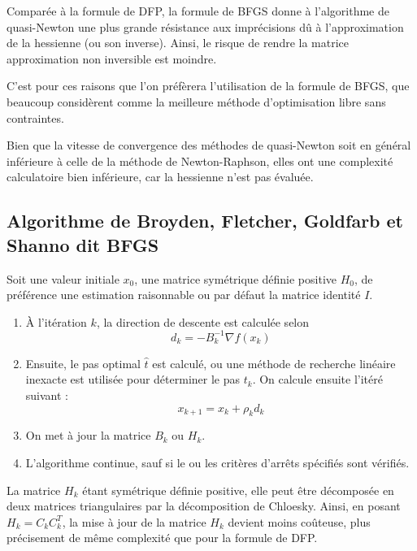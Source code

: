 \documentclass[3p, twocolumn]{elsarticle}
\begin{document}
Comparée à la formule de DFP, la formule de BFGS donne à l'algorithme de quasi-Newton une plus grande résistance aux imprécisions dû à l'approximation de la hessienne (ou son inverse). Ainsi, le risque de rendre la matrice approximation non inversible est moindre.

C'est pour ces raisons que l'on préfèrera l'utilisation de la formule de BFGS, que beaucoup considèrent comme la meilleure méthode d'optimisation libre sans contraintes.

Bien que la vitesse de convergence des méthodes de quasi-Newton soit en général inférieure à celle de la méthode de Newton-Raphson, elles ont une complexité calculatoire bien inférieure, car la hessienne n'est pas évaluée.

\subsection{Algorithme de Broyden, Fletcher, Goldfarb et Shanno dit BFGS}
Soit une valeur initiale $x_0$, une matrice symétrique définie positive $H_0$, de préférence une estimation raisonnable ou par défaut la matrice identité $I$.
\begin{enumerate}
    \item \`A l'itération $k$, la direction de descente est calculée selon
          \begin{equation*}
              d_{k}=-B_{k}^{-1}\nabla f(x_{k})
          \end{equation*}
    \item Ensuite, le pas optimal $\hat t$ est calculé, ou une méthode de recherche linéaire inexacte est utilisée pour déterminer le pas $t_k$. On calcule ensuite l'itéré suivant :
          \begin{equation*}
              x_{k+1}=x_{k}+\rho_{k}d_{k}
          \end{equation*}
    \item On met à jour la matrice $B_{k}$ ou $H_{k}$.
    \item L'algorithme continue, sauf si le ou les critères d'arrêts spécifiés sont vérifiés.
\end{enumerate}

La matrice $H_{k}$ étant symétrique définie positive, elle peut être décomposée en deux matrices triangulaires par la décomposition de Chloesky. Ainsi, en posant $H_{k}=C_{k}C_{k}^{T}$, la mise à jour de la matrice $H_{k}$ devient moins coûteuse, plus précisement de même complexité que pour la formule de DFP.
\end{document}
